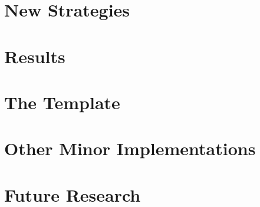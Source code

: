 \documentclass[xetex]{beamer}
\begin{document}
\section{New Strategies}




\section{Results}
	



\section{The Template}




\section{Other Minor Implementations}




\section{Future Research}









\end{document}
